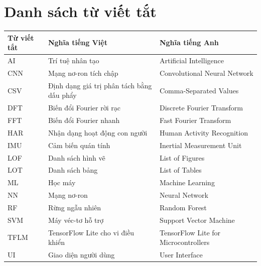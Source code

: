 \chapter*{Danh sách từ viết tắt}

\begin{table}[H]
    \centering
    \begin{tabular}{p{} p{} p{}}
        \toprule
        \textbf{Từ viết tắt} & \textbf{Nghĩa tiếng Việt} & \textbf{Nghĩa tiếng Anh} \\
        \midrule
        AI & Trí tuệ nhân tạo & Artificial Intelligence \\
        CNN & Mạng nơ-ron tích chập & Convolutional Neural Network \\
        CSV & Định dạng giá trị phân tách bằng dấu phẩy & Comma-Separated Values \\
        DFT & Biến đổi Fourier rời rạc & Discrete Fourier Transform \\
        FFT & Biến đổi Fourier nhanh & Fast Fourier Transform \\
        HAR & Nhận dạng hoạt động con người & Human Activity Recognition \\
        IMU & Cảm biến quán tính & Inertial Measurement Unit \\
        LOF & Danh sách hình vẽ & List of Figures \\
        LOT & Danh sách bảng & List of Tables \\
        ML & Học máy & Machine Learning \\
        NN & Mạng nơ-ron & Neural Network \\
        RF & Rừng ngẫu nhiên & Random Forest \\
        SVM & Máy véc-tơ hỗ trợ & Support Vector Machine \\
        TFLM & TensorFlow Lite cho vi điều khiển & TensorFlow Lite for Microcontrollers \\
        UI & Giao diện người dùng & User Interface \\
        \bottomrule
    \end{tabular}
\end{table}
